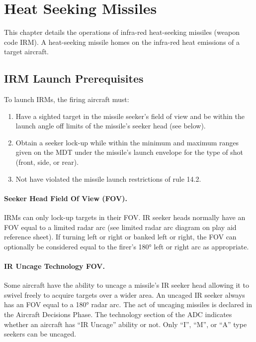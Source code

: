 \section{Heat Seeking Missiles}

This chapter details the operations of infra-red heat-seeking missiles (weapon code IRM). A heat-seeking missile homes on the infra-red heat emissions of a target aircraft.

\subsection{IRM Launch Prerequisites}

To launch IRMs, the firing aircraft must:

\begin{enumerate}
    \item Have a sighted target in the missile seeker's field of view and be within the launch angle off limits of the missile's seeker head (see below).
    \item Obtain a seeker lock-up while within the minimum and maximum ranges given on the MDT under the missile's launch envelope for the type of shot (front, side, or rear).
    \item Not have violated the missile launch restrictions of rule 14.2.
\end{enumerate}

\paragraph{Seeker Head Field Of View (FOV).} IRMs can only lock-up targets in their FOV. IR seeker heads normally have an FOV equal to a limited radar arc (see limited radar arc diagram on play aid reference sheet). If turning left or right or banked left or right, the FOV can optionally be considered equal to the firer’s 180° left or right arc as appropriate.

\paragraph{IR Uncage Technology FOV.} Some aircraft have the ability to uncage a missile's IR seeker head allowing it to swivel freely to acquire targets over a wider area. An uncaged IR seeker always has an FOV equal to a 180° radar arc. The act of uncaging missiles is declared in the Aircraft Decisions Phase. The technology section of the ADC indicates whether an aircraft has “IR Uncage” ability or not. Only “I”, “M”, or “A” type seekers can be uncaged.

